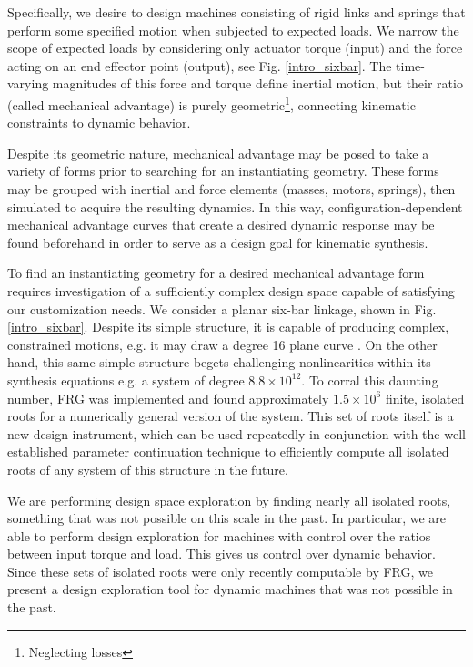 \documentclass[journal]{IEEEtran}
\begin{document}
Specifically, we desire to design machines consisting of rigid links and springs that perform some specified motion when subjected to expected loads.
We narrow the scope of expected loads by considering only actuator torque (input) and the force acting on an end effector point (output), see Fig. \ref{intro_sixbar}.
The time-varying magnitudes of this force and torque define inertial motion, but their ratio (called mechanical advantage) is purely geometric\footnote{Neglecting losses}, connecting kinematic constraints to dynamic behavior.

Despite its geometric nature, mechanical advantage may be posed to take a variety of forms prior to searching for an instantiating geometry.
These forms may be grouped with inertial and force elements (masses, motors, springs), then simulated to acquire the resulting dynamics.
In this way, configuration-dependent mechanical advantage curves that create a desired dynamic response may be found beforehand in order to serve as a design goal for kinematic synthesis.




To find an instantiating geometry for a desired mechanical advantage form requires investigation of a sufficiently complex design space capable of satisfying our customization needs.
We consider a planar six-bar linkage, shown in Fig. \ref{intro_sixbar}.
Despite its simple structure, it is capable of producing complex, constrained motions, e.g. it may draw a degree 16 plane curve \cite{primroseSixbarMotionII1967}.
On the other hand, this same simple structure begets challenging nonlinearities within its synthesis equations e.g. a system of degree $8.8 \times 10^{12}$.
To corral this daunting number, FRG was implemented and found approximately $1.5 \times 10^6$ finite, isolated roots for a numerically general version of the system.
This set of roots itself is a new design instrument, which can be used repeatedly in conjunction with the well established parameter continuation technique \cite{morganCoefficientparameterPolynomialContinuation1989} to efficiently compute all isolated roots of any system of this structure in the future.

We are performing design space exploration by finding nearly all isolated roots, something that was not possible on this scale in the past.
In particular, we are able to perform design exploration for machines with control over the ratios between input torque and load.  This gives us control over dynamic behavior.
Since these sets of isolated roots were only recently computable by FRG, we present a design exploration tool for dynamic machines that was not possible in the past.
\end{document}
